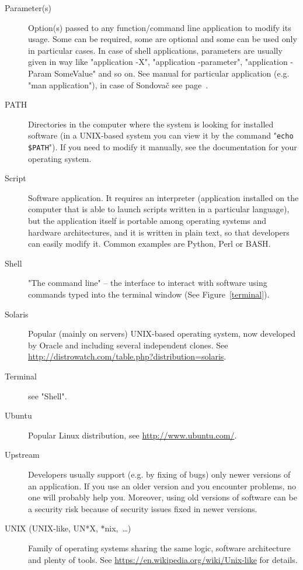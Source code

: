 \documentclass[a4paper, 11pt, twoside]{article}
\begin{document}
\begin{description}
\item[Parameter(s)] Option(s) passed to any function/command line application to modify its usage. Some can be required, some are optional and some can be used only in particular cases. In case of shell applications, parameters are usually given in way like "application -X", "application -\-parameter", "application -Param SomeValue" and so on. See manual for particular application (e.g. "man application"), in case of Sondovač see page~\pageref{script-usage}.
\item[PATH] Directories in the computer where the system is looking for installed software (in a UNIX-based system you can view it by the command "\texttt{echo \$PATH}"). If you need to modify it manually, see the documentation for your operating system.
\item[Script] Software application. It requires an interpreter (application installed on the computer that is able to launch scripts written in a particular language), but the application itself is portable among operating systems and hardware architectures, and it is written in plain text, so that developers can easily modify it. Common examples are Python, Perl or BASH.
\item[Shell] "The command line" -- the interface to interact with software using commands typed into the terminal window (See Figure~\ref{terminal}).
\item[Solaris] Popular (mainly on servers) UNIX-based operating system, now developed by Oracle and including several independent clones. See \href{http://distrowatch.com/table.php?distribution=solaris}{http://distrowatch.com/table.php?distribution=solaris}.
\item[Terminal] see "Shell".
\item[Ubuntu] Popular Linux distribution, see \href{http://www.ubuntu.com/}{http://www.ubuntu.com/}.
\item[Upstream] Developers usually support (e.g. by fixing of bugs) only newer versions of an application. If you use an older version and you encounter problems, no one will probably help you. Moreover, using old versions of software can be a security risk because of security issues fixed in newer versions.
\item[UNIX (UNIX-like, UN*X, *nix,~\ldots)] Family of operating systems sharing the same logic, software architecture and plenty of tools. See \href{https://en.wikipedia.org/wiki/Unix-like}{https://en.wikipedia.org/wiki/Unix-like} for details.
\end{description}
\end{document}
